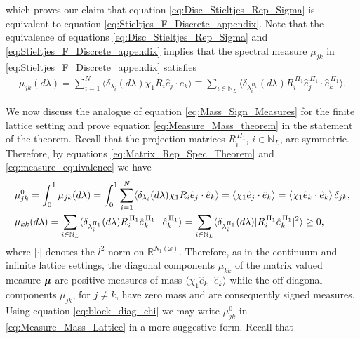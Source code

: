 \documentclass{cmslatex}
\newcommand\bmu{\mbox{\boldmath${\mu}$}}
\begin{document}
%
which proves our claim that equation \eqref{eq:Disc_Stieltjes_Rep_Sigma} is
equivalent to equation \eqref{eq:Stieltjes_F_Discrete_appendix}. Note
that the equivalence of equations \eqref{eq:Disc_Stieltjes_Rep_Sigma}
and \eqref{eq:Stieltjes_F_Discrete_appendix} implies that the spectral 
measure $\mu_{jk}$ in \eqref{eq:Stieltjes_F_Discrete_appendix} satisfies 
%
\begin{align}\label{eq:measure_equivalence}
  \mu_{jk}(d\lambda)=\sum_{i=1}^N \langle\delta_{\lambda_i}(d\lambda)\chi_1R_i\hat{e}_j\cdot\hat{e}_k\rangle
         \equiv\sum_{i\in\mathbb{N}_L}
          \langle\delta_{\lambda_i^{\Pi_1}}(d\lambda)R_i^{\,\Pi_1}\hat{e}_j^{\,\Pi_1}\cdot\hat{e}_k^{\,\Pi_1}\rangle.
\end{align}
%

We now discuss the analogue of equation \eqref{eq:Mass_Sign_Measures}
for the finite lattice setting and prove equation
\eqref{eq:Measure_Mass_theorem} in the statement of the
theorem. Recall that the projection matrices $R_i^{\,\Pi_1}$,
$i\in\mathbb{N}_L$, are symmetric. Therefore, by equations
\eqref{eq:Matrix_Rep_Spec_Theorem} and \eqref{eq:measure_equivalence}
we have   
%
\begin{align}\label{eq:Measure_Mass_Lattice}
  &\mu^0_{jk}=\int_0^1\mu_{jk}(d\lambda)
       =\int_0^1\sum_{i=1}^N \langle\delta_{\lambda_i}(d\lambda)\chi_1R_i\hat{e}_j\cdot\hat{e}_k\rangle
       =\langle\chi_1\hat{e}_j\cdot\hat{e}_k\rangle
       =\langle\chi_1\hat{e}_k\cdot\hat{e}_k\rangle\,\delta_{jk}, \notag\\
 &\mu_{kk}(d\lambda)=\sum_{i\in\mathbb{N}_L}
             \langle\delta_{\lambda_i^{\Pi_1}}(d\lambda)R_i^{\,\Pi_1}\hat{e}_k^{\,\Pi_1}\cdot\hat{e}_k^{\,\Pi_1}\rangle
         =\sum_{i\in\mathbb{N}_L}
             \langle\delta_{\lambda_i^{\Pi_1}}(d\lambda)|R_i^{\,\Pi_1}\hat{e}_k^{\,\Pi_1}|^2\rangle\geq0,            
\end{align}
%
where $|\cdot|$ denotes the $l^2$ norm on $\mathbb{R}^{N_1(\omega)}$.
Therefore, as in the continuum and infinite lattice settings, the
diagonal components $\mu_{kk}$ of the matrix valued measure $\bmu$ are
positive measures of mass $\langle\chi_1\hat{e}_k\cdot\hat{e}_k\rangle$ while the
off-diagonal components $\mu_{jk}$, for $j\neq k$, have zero mass and are
consequently signed measures. Using equation
\eqref{eq:block_diag_chi} we may write $\mu^0_{jk}$ in
\eqref{eq:Measure_Mass_Lattice} in a more suggestive form. Recall that  
\end{document}
